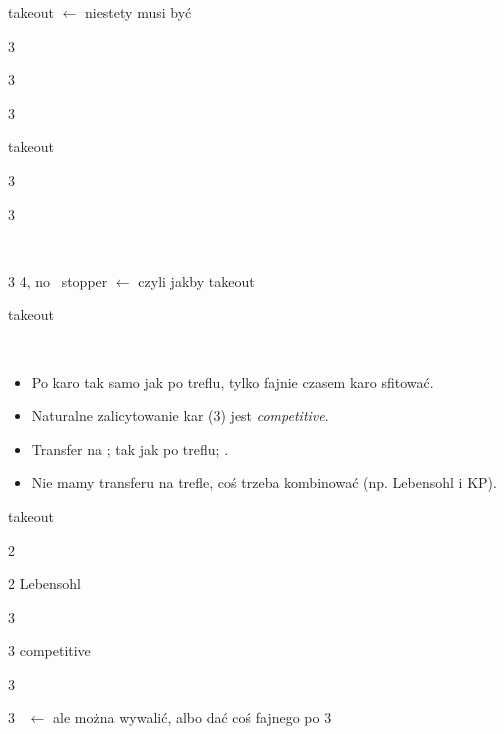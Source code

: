 \documentclass[12pt, a4paper]{article}
\begin{document}
\sequence{{1\clubs}{(3\clubs)}}
\begin{options}[1]
    \item[\dbl] takeout \gf $\leftarrow$ niestety musi być \gf
    \item[3\diams] \then\ \hearts\ \invp
    \item[3\hearts] \then\ \spades\ \invp
    \item[3\spades] \then\ \diams\ \gf
\end{options}

\sequence{{1\clubs}{(3\diams)}}
\begin{options}[1]
    \item[\dbl] takeout \gf
    \item[3\hearts] \then\ \spades\ \invp
    \item[3\spades] \then\ \hearts\ \gf
\end{options}

\sequence{{1\clubs}{(3\hearts)}}
\begin{options}[1]
    \item[\dbl] \spades\ \invp \imp
    \item[3\spades] 4\spades, no \hearts\ stopper \gf $\leftarrow$ czyli jakby takeout
\end{options}

\sequence{{1\clubs}{(3\spades)}}
\begin{options}[1]
    \item[\dbl] takeout \gf
\end{options}

\newpage
{\Huge{\diams}}\\
\begin{itemize}
    \item Po karo tak samo jak po treflu, tylko fajnie czasem karo
    sfitować. 
    \item Naturalne zalicytowanie kar (3\diams) jest \textit{competitive}.
    \item Transfer na \diams; tak jak po treflu; \invp.
    \item Nie mamy transferu na trefle, coś trzeba kombinować (np. Lebensohl i KP).
\end{itemize}

\sequence{{1\diams}{(2\hearts)}}
\begin{options}[1]
    \item[\dbl] takeout
    \item[2\spades] \nat\ \nf
    \item[2\nt] Lebensohl
    \item[3\clubs] \then\ \diams\ \invp
    \item[3\diams] competitive
    \item[3\hearts] \then\ \spades\ \invp
    \item[3\spades] \then\ \nt $\leftarrow$ ale można wywalić, albo dać coś fajnego po 3\nt
\end{options}
\end{document}

